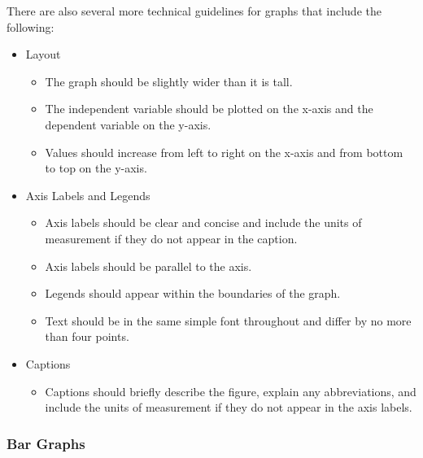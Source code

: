 \documentclass[
]{krantz}
\providecommand{\tightlist}{%
  \setlength{\itemsep}{0pt}\setlength{\parskip}{0pt}}
\begin{document}
There are also several more technical guidelines for graphs that include the following:

\begin{itemize}
\tightlist
\item
  Layout

  \begin{itemize}
  \tightlist
  \item
    The graph should be slightly wider than it is tall.
  \item
    The independent variable should be plotted on the x-axis and the dependent variable on the y-axis.
  \item
    Values should increase from left to right on the x-axis and from bottom to top on the y-axis.
  \end{itemize}
\item
  Axis Labels and Legends

  \begin{itemize}
  \tightlist
  \item
    Axis labels should be clear and concise and include the units of measurement if they do not appear in the caption.
  \item
    Axis labels should be parallel to the axis.
  \item
    Legends should appear within the boundaries of the graph.
  \item
    Text should be in the same simple font throughout and differ by no more than four points.
  \end{itemize}
\item
  Captions

  \begin{itemize}
  \tightlist
  \item
    Captions should briefly describe the figure, explain any abbreviations, and include the units of measurement if they do not appear in the axis labels.
  \end{itemize}
\end{itemize}

\hypertarget{bar-graphs}{%
\subsubsection*{Bar Graphs}\label{bar-graphs}}
\end{document}
